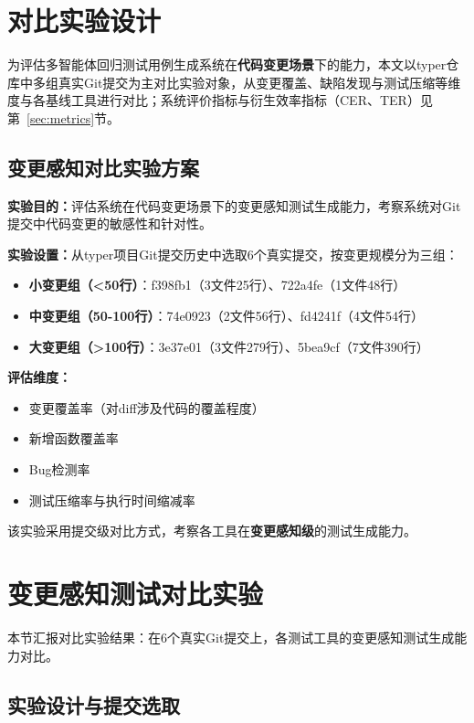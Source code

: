 \section{对比实验设计}
\label{sec:exp_design}

为评估多智能体回归测试用例生成系统在\textbf{代码变更场景}下的能力，本文以typer仓库中多组真实Git提交为主对比实验对象，从变更覆盖、缺陷发现与测试压缩等维度与各基线工具进行对比；系统评价指标与衍生效率指标（CER、TER）见第~\ref{sec:metrics}节。

\subsection{变更感知对比实验方案}
\label{sssec:expB_design}

\textbf{实验目的：}评估系统在代码变更场景下的变更感知测试生成能力，考察系统对Git提交中代码变更的敏感性和针对性。

\textbf{实验设置：}从typer项目Git提交历史中选取6个真实提交，按变更规模分为三组：

\begin{itemize}
    \item \textbf{小变更组（<50行）}：f398fb1（3文件25行）、722a4fe（1文件48行）
    \item \textbf{中变更组（50-100行）}：74e0923（2文件56行）、fd4241f（4文件54行）
    \item \textbf{大变更组（>100行）}：3e37e01（3文件279行）、5bea9cf（7文件390行）
\end{itemize}

\textbf{评估维度：}
\begin{itemize}
    \item 变更覆盖率（对diff涉及代码的覆盖程度）
    \item 新增函数覆盖率
    \item Bug检测率
    \item 测试压缩率与执行时间缩减率
\end{itemize}

该实验采用提交级对比方式，考察各工具在\textbf{变更感知级}的测试生成能力。

\section{变更感知测试对比实验}
\label{sec:expB_results}

本节汇报对比实验结果：在6个真实Git提交上，各测试工具的变更感知测试生成能力对比。

\subsection{实验设计与提交选取}
\label{ssec:expB_design_detail}

